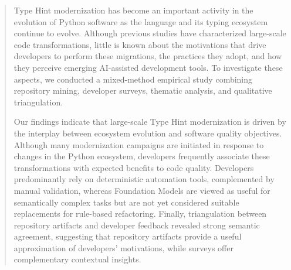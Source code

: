 \begin{abstract}
Type Hint modernization has become an important activity in the evolution of Python software as the language and its typing ecosystem continue to evolve. Although previous studies have characterized large-scale code transformations, little is known about the motivations that drive developers to perform these migrations, the practices they adopt, and how they perceive emerging AI-assisted development tools. To investigate these aspects, we conducted a mixed-method empirical study combining repository mining, developer surveys, thematic analysis, and qualitative triangulation. 

Our findings indicate that large-scale Type Hint modernization is driven by the interplay between ecosystem evolution and software quality objectives. Although many modernization campaigns are initiated in response to changes in the Python ecosystem, developers frequently associate these transformations with expected benefits to code quality. Developers predominantly rely on deterministic automation tools, complemented by manual validation, whereas Foundation Models are viewed as useful for semantically complex tasks but are not yet considered suitable replacements for rule-based refactoring. Finally, triangulation between repository artifacts and developer feedback revealed strong semantic agreement, suggesting that repository artifacts provide a useful approximation of developers' motivations, while surveys offer complementary contextual insights.
\end{abstract}





